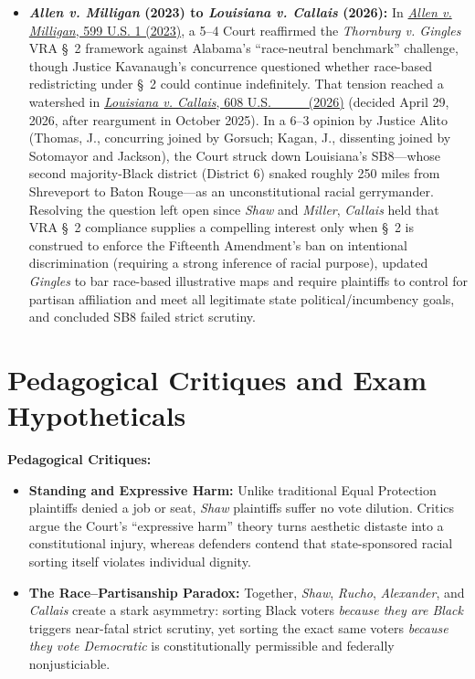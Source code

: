 \documentclass[12pt]{article}
\begin{document}
\begin{itemize}
  \item \textbf{\textit{Allen v. Milligan} (2023) to \textit{Louisiana v. Callais} (2026):} In \href{https://supreme.justia.com/cases/federal/us/599/21-1086/}{\textit{Allen v. Milligan}, 599 U.S. 1 (2023)}, a 5--4 Court reaffirmed the \textit{Thornburg v. Gingles} VRA \S~2 framework against Alabama's ``race-neutral benchmark'' challenge, though Justice Kavanaugh's concurrence questioned whether race-based redistricting under \S~2 could continue indefinitely. That tension reached a watershed in \href{https://supreme.justia.com/cases/federal/us/608/24-109/}{\textit{Louisiana v. Callais}, 608 U.S. \_\_\_ (2026)} (decided April 29, 2026, after reargument in October 2025). In a 6--3 opinion by Justice Alito (Thomas, J., concurring joined by Gorsuch; Kagan, J., dissenting joined by Sotomayor and Jackson), the Court struck down Louisiana's SB8---whose second majority-Black district (District 6) snaked roughly 250 miles from Shreveport to Baton Rouge---as an unconstitutional racial gerrymander. Resolving the question left open since \textit{Shaw} and \textit{Miller}, \textit{Callais} held that VRA \S~2 compliance supplies a compelling interest only when \S~2 is construed to enforce the Fifteenth Amendment's ban on intentional discrimination (requiring a strong inference of racial purpose), updated \textit{Gingles} to bar race-based illustrative maps and require plaintiffs to control for partisan affiliation and meet all legitimate state political/incumbency goals, and concluded SB8 failed strict scrutiny.
\end{itemize}

\section{Pedagogical Critiques and Exam Hypotheticals}
\textbf{Pedagogical Critiques:}
\begin{itemize}
  \item \textbf{Standing and Expressive Harm:} Unlike traditional Equal Protection plaintiffs denied a job or seat, \textit{Shaw} plaintiffs suffer no vote dilution. Critics argue the Court's ``expressive harm'' theory turns aesthetic distaste into a constitutional injury, whereas defenders contend that state-sponsored racial sorting itself violates individual dignity.
  \item \textbf{The Race--Partisanship Paradox:} Together, \textit{Shaw}, \textit{Rucho}, \textit{Alexander}, and \textit{Callais} create a stark asymmetry: sorting Black voters \textit{because they are Black} triggers near-fatal strict scrutiny, yet sorting the exact same voters \textit{because they vote Democratic} is constitutionally permissible and federally nonjusticiable.
\end{itemize}
\end{document}
